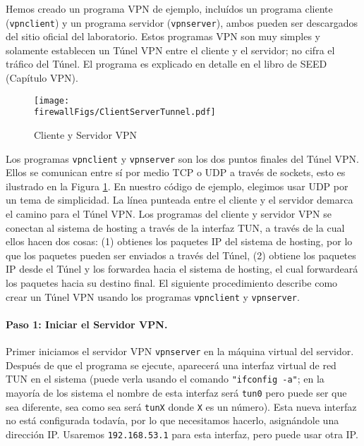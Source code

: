 Hemos creado un programa VPN de ejemplo, incluídos un programa cliente (\texttt{vpnclient}) y un programa servidor (\texttt{vpnserver}), ambos pueden ser descargados del sitio oficial del laboratorio. Estos programas VPN son muy simples y solamente establecen un Túnel VPN entre el cliente y el servidor; no cifra el tráfico del Túnel.
El programa es explicado en detalle en el libro de SEED (Capítulo VPN).


\begin{figure}[htb]
\begin{center}
\texttt{[image: \\firewallFigs/ClientServerTunnel.pdf]}
\end{center}
\caption{Cliente y Servidor VPN}
\label{vpn_firewall:fig:client_server}
\end{figure}

Los programas \texttt{vpnclient} y \texttt{vpnserver} son los dos puntos finales del Túnel VPN. Ellos se comunican entre sí por medio TCP o UDP a través de sockets, esto es ilustrado en la Figura \ref{vpn_firewall:fig:client_server}. En nuestro código de ejemplo, elegimos usar UDP por un tema de simplicidad. La línea punteada entre el cliente y el servidor demarca el camino para el Túnel VPN.
Los programas del cliente y servidor VPN se conectan al sistema de hosting a través de la interfaz TUN, a través de la cual ellos hacen dos cosas: (1) obtienes los paquetes IP del sistema de hosting, por lo que los paquetes pueden ser enviados a través del Túnel, (2) obtiene los paquetes IP desde el Túnel y los forwardea hacia el sistema de hosting, el cual forwardeará los paquetes hacia su destino final.
El siguiente procedimiento describe como crear un Túnel VPN usando los programas \texttt{vpnclient} y \texttt{vpnserver}.


\paragraph{Paso 1: Iniciar el Servidor VPN.}
Primer iniciamos el servidor VPN \texttt{vpnserver} en la máquina virtual del servidor.
Después de que el programa se ejecute, aparecerá una interfaz virtual de red TUN en el sistema (puede verla usando el comando \texttt{"ifconfig -a"}; en la mayoría de los sistema el nombre de esta interfaz será \texttt{tun0} pero puede ser que sea diferente, sea como sea será \texttt{tunX} donde \texttt{X} es un número).
Esta nueva interfaz no está configurada todavía, por lo que necesitamos hacerlo, asignándole una dirección IP. Usaremos \texttt{192.168.53.1} para esta interfaz, pero puede usar otra IP.

